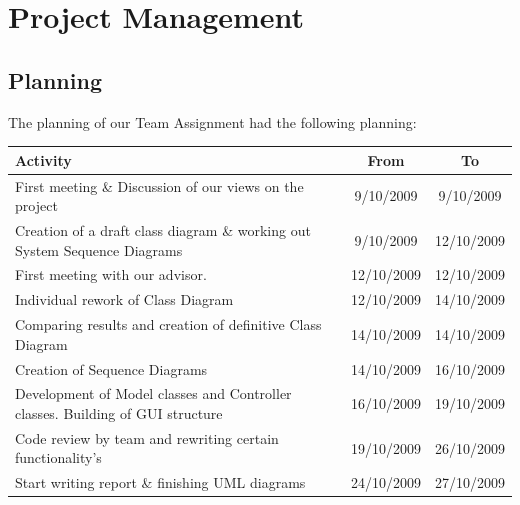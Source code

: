 \documentclass[a4paper,11pt]{article}
\begin{document}
	\section{Project Management}
		\subsection{Planning}
		The planning of our Team Assignment had the following planning:\\
		\begin{tabular}{p{200 pt}|c|c}
		Activity & From & To\\
		\hline
		First meeting \& Discussion of our views on the project & 9/10/2009 & 9/10/2009\\ \hline
		Creation of a draft class diagram \& working out System Sequence Diagrams & 9/10/2009 & 12/10/2009\\ \hline
		First meeting with our advisor. & 12/10/2009 & 12/10/2009\\ \hline
		Individual rework of Class Diagram & 12/10/2009 & 14/10/2009\\ \hline
		Comparing results and creation of definitive Class Diagram & 14/10/2009 & 14/10/2009\\ \hline
		Creation of Sequence Diagrams & 14/10/2009 & 16/10/2009\\ \hline
		Development of Model classes and Controller classes. Building of GUI structure & 16/10/2009 & 19/10/2009\\ \hline
		Code review by team and rewriting certain functionality's & 19/10/2009 & 26/10/2009\\ \hline
		Start writing report \& finishing UML diagrams & 24/10/2009 & 27/10/2009\\ \hline
		\end{tabular}
\end{document}
